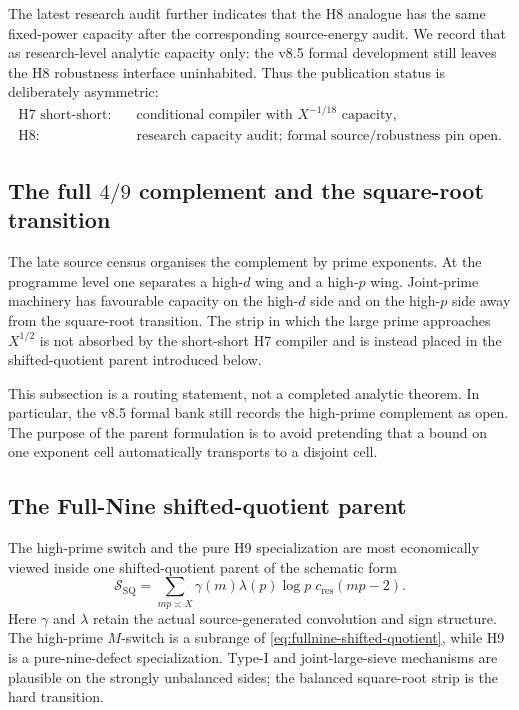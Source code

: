 \documentclass[11pt]{article}
\theoremstyle{definition}
\newcommand{\1}{\mathbf 1}
\begin{document}
The latest research audit further indicates that the H8 analogue has the same
fixed-power capacity after the corresponding source-energy audit.  We record
that as research-level analytic capacity only: the v8.5 formal development
still leaves the H8 robustness interface uninhabited.  Thus the publication
status is deliberately asymmetric:
\[
\begin{aligned}
 \text{H7 short-short:}&\quad \text{conditional compiler with }X^{-1/18}\text{ capacity},\\
 \text{H8:}&\quad \text{research capacity audit; formal source/robustness pin open}.
\end{aligned}
\]

\subsection{The full \texorpdfstring{$4/9$}{4/9} complement and the square-root transition}
The late source census organises the complement by prime exponents.  At the
programme level one separates a high-$d$ wing and a high-$p$ wing.  Joint-prime
machinery has favourable capacity on the high-$d$ side and on the high-$p$
side away from the square-root transition.  The strip in which the large
prime approaches $X^{1/2}$ is not absorbed by the short-short H7 compiler and
is instead placed in the shifted-quotient parent introduced below.

This subsection is a routing statement, not a completed analytic theorem.  In
particular, the v8.5 formal bank still records the high-prime complement as
open.  The purpose of the parent formulation is to avoid pretending that a
bound on one exponent cell automatically transports to a disjoint cell.

\subsection{The Full-Nine shifted-quotient parent}
The high-prime switch and the pure H9 specialization are most economically
viewed inside one shifted-quotient parent of the schematic form
\begin{equation}
   \mathcal S_{\mathrm{SQ}}
   =\sum_{mp\asymp X}\gamma(m)\lambda(p)\log p\;c_{\mathrm{res}}(mp-2).
   \label{eq:fullnine-shifted-quotient}
\end{equation}
Here $\gamma$ and $\lambda$ retain the actual source-generated convolution and
sign structure.  The high-prime $M$-switch is a subrange of
\eqref{eq:fullnine-shifted-quotient}, while H9 is a pure-nine-defect
specialization.  Type-I and joint-large-sieve mechanisms are plausible on the
strongly unbalanced sides; the balanced square-root strip is the hard
transition.
\end{document}
